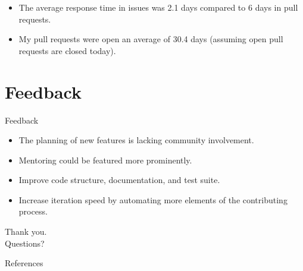 \documentclass{beamer}
\theoremstyle{definition}
\begin{document}
\begin{frame}{}
\begin{itemize}
    \item The average response time in issues was 2.1 days compared to 6 days in pull requests.\pause
    \item My pull requests were open an average of 30.4 days (assuming open pull requests are closed today).
\end{itemize}
\end{frame}

\section{Feedback}
\begin{frame}{Feedback}
\begin{itemize}
    \item The planning of new features is lacking community involvement.\pause
    \item Mentoring could be featured more prominently.\pause
    \item Improve code structure, documentation, and test suite.\pause
    \item Increase iteration speed by automating more elements of the contributing process.
\end{itemize}
\end{frame}

\begin{frame}{}
\centering
Thank you. \\
Questions?
\end{frame}

\begin{frame}[allowframebreaks]{References}

\printbibliography

\end{frame}
\end{document}

